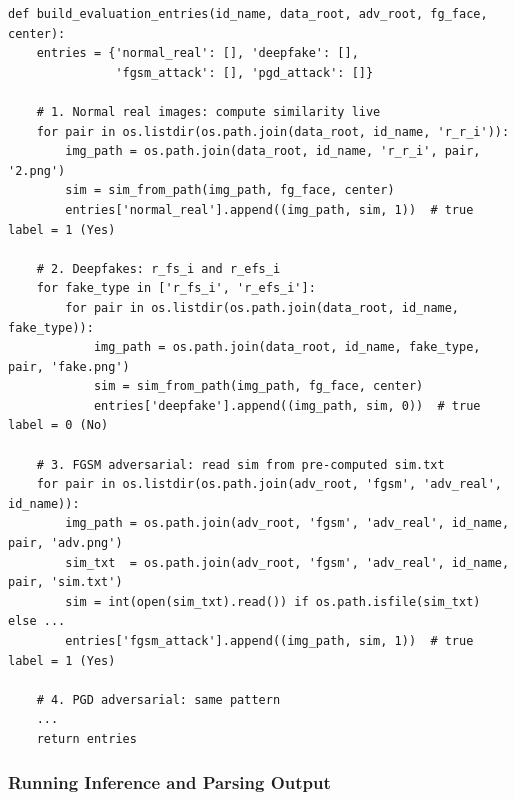 \documentclass[12pt,a4paper]{article}
\begin{document}
\begin{lstlisting}[caption={Building the four evaluation sets for one VIP}]
def build_evaluation_entries(id_name, data_root, adv_root, fg_face, center):
    entries = {'normal_real': [], 'deepfake': [],
               'fgsm_attack': [], 'pgd_attack': []}

    # 1. Normal real images: compute similarity live
    for pair in os.listdir(os.path.join(data_root, id_name, 'r_r_i')):
        img_path = os.path.join(data_root, id_name, 'r_r_i', pair, '2.png')
        sim = sim_from_path(img_path, fg_face, center)
        entries['normal_real'].append((img_path, sim, 1))  # true label = 1 (Yes)

    # 2. Deepfakes: r_fs_i and r_efs_i
    for fake_type in ['r_fs_i', 'r_efs_i']:
        for pair in os.listdir(os.path.join(data_root, id_name, fake_type)):
            img_path = os.path.join(data_root, id_name, fake_type, pair, 'fake.png')
            sim = sim_from_path(img_path, fg_face, center)
            entries['deepfake'].append((img_path, sim, 0))  # true label = 0 (No)

    # 3. FGSM adversarial: read sim from pre-computed sim.txt
    for pair in os.listdir(os.path.join(adv_root, 'fgsm', 'adv_real', id_name)):
        img_path = os.path.join(adv_root, 'fgsm', 'adv_real', id_name, pair, 'adv.png')
        sim_txt  = os.path.join(adv_root, 'fgsm', 'adv_real', id_name, pair, 'sim.txt')
        sim = int(open(sim_txt).read()) if os.path.isfile(sim_txt) else ...
        entries['fgsm_attack'].append((img_path, sim, 1))  # true label = 1 (Yes)

    # 4. PGD adversarial: same pattern
    ...
    return entries
\end{lstlisting}

\subsubsection{Running Inference and Parsing Output}
\end{document}
